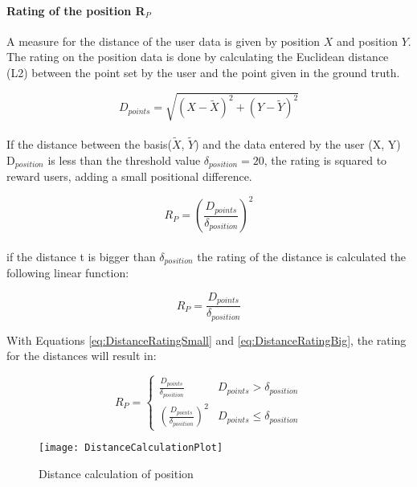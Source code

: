 \paragraph{Rating of the position R$_{P}$}

A measure for the distance of the user data is given by position $X$ and position $Y$.
The rating on the position data is done by calculating the Euclidean distance (L2) between the point set by the user and the point given in the ground truth.

\begin{equation}
	D_{points} =\sqrt{(X - \widetilde{X})^2 + (Y - \widetilde{Y}) ^2}
\end{equation}
\\

If the distance between the basis($\widetilde{X}$, $\widetilde{Y}$) and the data entered by the user (X, Y) D$_{position}$ is less than the threshold value $\delta_{position} = 20$, the rating is squared to reward users, adding a small positional difference.

\begin{equation}
    R_{P} = (\frac{D_{points}}{\delta_{position}})^2
	\label{eq:DistanceRatingSmall}
\end{equation}
\\


if the distance t is bigger than $\delta_{position}$ the rating of the distance is calculated the following linear function:

\begin{equation}
    R_{P} = \frac{D_{points}}{\delta_{position}}
    \label{eq:DistanceRatingBig}
\end{equation}


With Equations \ref{eq:DistanceRatingSmall} and \ref{eq:DistanceRatingBig}, the rating for the distances will result in:

\begin{equation}
	R_{P} =
	\begin{cases}
		\frac{D_{points}}{\delta_{position}}	&	D_{points} > \delta_{position} \\
		(\frac{D_{points}}{\delta_{position}})^2 &	D_{points} \le \delta_{position}
	\end{cases}
\end{equation}

\begin{figure}[H]
    \centering
    \texttt{[image: DistanceCalculationPlot]}
    \caption{Distance calculation of position}
    \label{fig:distPos}
\end{figure}

